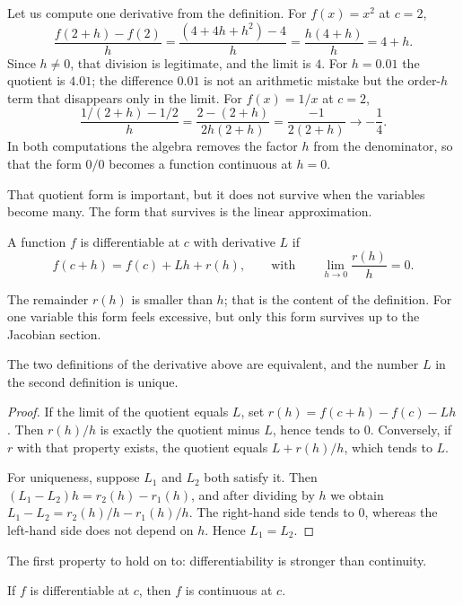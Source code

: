 Let us compute one derivative from the definition. For $f(x)=x^{2}$ at $c=2$,
\[
  \frac{f(2+h)-f(2)}{h}=\frac{(4+4h+h^{2})-4}{h}=\frac{h(4+h)}{h}=4+h .
\]
Since $h\neq0$, that division is legitimate, and the limit is $4$. For $h=0.01$ the quotient
is $4.01$; the difference $0.01$ is not an arithmetic mistake but the order-$h$ term that
disappears only in the limit. For $f(x)=1/x$ at $c=2$,
\[
  \frac{1/(2+h)-1/2}{h}
  =\frac{2-(2+h)}{2h(2+h)}=\frac{-1}{2(2+h)}\longrightarrow-\frac14 .
\]
In both computations the algebra removes the factor $h$ from the denominator, so that the
form $0/0$ becomes a function continuous at $h=0$.

That quotient form is important, but it does not survive when the variables become many. The
form that survives is the linear approximation.

\begin{definisi}
A function $f$ is differentiable at $c$ with derivative $L$ if
\[
  f(c+h)=f(c)+Lh+r(h),
  \qquad\text{with}\qquad
  \lim_{h\to0}\frac{r(h)}{h}=0 .
\]
\end{definisi}

The remainder $r(h)$ is smaller than $h$; that is the content of the definition. For one
variable this form feels excessive, but only this form survives up to the Jacobian section.

\begin{proposisi}
The two definitions of the derivative above are equivalent, and the number $L$ in the second
definition is unique.
\end{proposisi}

\begin{proof}
If the limit of the quotient equals $L$, set $r(h)=f(c+h)-f(c)-Lh$. Then $r(h)/h$ is exactly
the quotient minus $L$, hence tends to $0$. Conversely, if $r$ with that property exists, the
quotient equals $L+r(h)/h$, which tends to $L$.

For uniqueness, suppose $L_{1}$ and $L_{2}$ both satisfy it. Then
$(L_{1}-L_{2})h=r_{2}(h)-r_{1}(h)$, and after dividing by $h$ we obtain
$L_{1}-L_{2}=r_{2}(h)/h-r_{1}(h)/h$. The right-hand side tends to $0$, whereas the left-hand
side does not depend on $h$. Hence $L_{1}=L_{2}$.
\end{proof}

The first property to hold on to: differentiability is stronger than continuity.

\begin{proposisi}
If $f$ is differentiable at $c$, then $f$ is continuous at $c$.
\end{proposisi}

